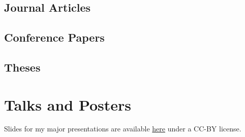 \documentclass[11pt,letter,sans]{moderncv}
\begin{document}
\setlength\fboxsep{2pt}





	\subsection{Journal Articles}
	\leavevmode\printbibliography[type=article, heading=none, resetnumbers=true]
	\subsection{Conference Papers}
	\leavevmode\printbibliography[type=inproceedings, heading=none, resetnumbers=true]
	\subsection{Theses}
	\leavevmode\printbibliography[type=thesis, heading=none, resetnumbers=true]


\section{Talks and Posters}
Slides for my major presentations are available
\href{https:www.coleridgefaraday.com/talks/}{here}
under a CC-BY license.
\end{document}
